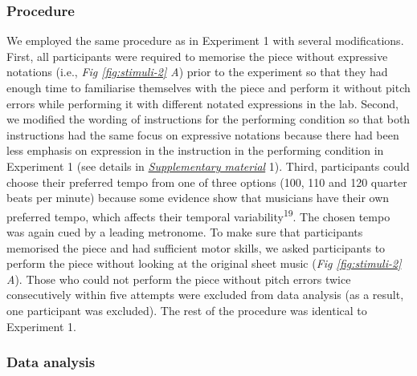 \documentclass[
  man,floatsintext]{apa6}
\begin{document}
\hypertarget{procedure-2}{%
\subsubsection{Procedure}\label{procedure-2}}

We employed the same procedure as in Experiment 1 with several modifications. First, all participants were required to memorise the piece without expressive notations (i.e., \emph{Fig \ref{fig:stimuli-2} A}) prior to the experiment so that they had enough time to familiarise themselves with the piece and perform it without pitch errors while performing it with different notated expressions in the lab. Second, we modified the wording of instructions for the performing condition so that both instructions had the same focus on expressive notations because there had been less emphasis on expression in the instruction in the performing condition in Experiment 1 (see details in \emph{\protect\hyperlink{supplementary}{Supplementary material}} 1). Third, participants could choose their preferred tempo from one of three options (100, 110 and 120 quarter beats per minute) because some evidence show that musicians have their own preferred tempo, which affects their temporal variability\textsuperscript{19}. The chosen tempo was again cued by a leading metronome. To make sure that participants memorised the piece and had sufficient motor skills, we asked participants to perform the piece without looking at the original sheet music (\emph{Fig \ref{fig:stimuli-2} A}). Those who could not perform the piece without pitch errors twice consecutively within five attempts were excluded from data analysis (as a result, one participant was excluded). The rest of the procedure was identical to Experiment 1.

\hypertarget{data-analysis-1}{%
\subsubsection{Data analysis}\label{data-analysis-1}}
\end{document}
